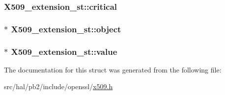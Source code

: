 \subsubsection[{\texorpdfstring{critical}{critical}}]{ X509\+\_\+extension\+\_\+st\+::critical}\hypertarget{struct_x509__extension__st_a143f7da8b44e344f89faf5ffc657031b}{}\label{struct_x509__extension__st_a143f7da8b44e344f89faf5ffc657031b}
\subsubsection[{\texorpdfstring{object}{object}}]{$\ast$ X509\+\_\+extension\+\_\+st\+::object}\hypertarget{struct_x509__extension__st_a8aea7d682ad5be95235abe897c0160fa}{}\label{struct_x509__extension__st_a8aea7d682ad5be95235abe897c0160fa}
\subsubsection[{\texorpdfstring{value}{value}}]{$\ast$ X509\+\_\+extension\+\_\+st\+::value}\hypertarget{struct_x509__extension__st_a670220c7ca6eef25dde30f43db492114}{}\label{struct_x509__extension__st_a670220c7ca6eef25dde30f43db492114}


The documentation for this struct was generated from the following file\+:\begin{DoxyCompactItemize}
\item 
src/hal/pb2/include/openssl/\hyperlink{x509_8h}{x509.\+h}\end{DoxyCompactItemize}

